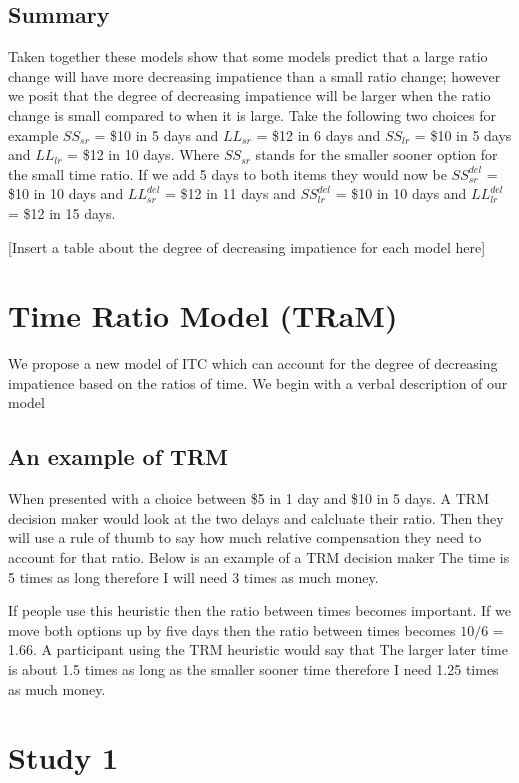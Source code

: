 \documentclass[]{article}
\begin{document}
\subsection{Summary}
Taken together these models show that some models predict that a large ratio change will have more decreasing impatience than a small ratio change; however we posit that the degree of  decreasing impatience will be larger when the ratio change is small compared to when it is large.
Take the following two choices for example $SS_{sr}$ = \$10 in 5 days and $LL_{sr}$ = \$12 in 6 days and $SS_{lr}$ = \$10 in 5 days and $LL_{lr}$ = \$12 in 10 days. Where $SS_{sr}$ stands for the smaller sooner option for the small time ratio. 
If we add 5 days to both items they would now be $SS_{sr}^{del}$ = \$10 in 10 days and $LL_{sr}^{del}$ = \$12 in 11 days and $SS_{lr}^{del}$ = \$10 in 10 days and $LL_{lr}^{del}$ = \$12 in 15 days. 

[Insert a table about the degree of decreasing impatience for each model here]

\section{Time Ratio Model (TRaM)}

We propose a new model of ITC which can account for the degree of decreasing impatience based on the ratios of time. 
We begin with a verbal description of our model

\subsection{An example of TRM}

When presented with a choice between \$5 in 1 day and \$10 in 5 days. 
A TRM decision maker would look at the two delays and calcluate their ratio. 
Then they will use a rule of thumb to say how much relative compensation they need to account for that ratio. Below is an example of a TRM decision maker
The time is 5 times as long therefore I will need 3 times as much money. 

If people use this heuristic then the ratio between times becomes important. 
If we move both options up by five days then the ratio between times becomes $10/6$ = 1.66. A participant using the TRM heuristic would say that 
The larger later time is about 1.5 times as long as the smaller sooner time therefore I need 1.25 times as much money. 


\section{Study 1}
\end{document}
